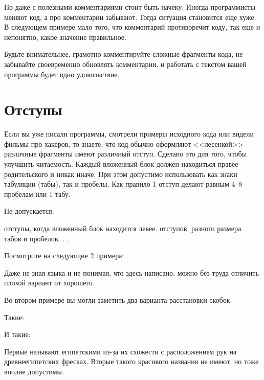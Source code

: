 \documentclass{article}
\begin{document}
Но даже с полезными комментариями стоит быть начеку. Иногда программисты меняют код, а про комментарии забывают. Тогда ситуация становится еще хуже. В следующем примере мало того, что комментарий противоречит коду, так еще и непонятно, какое значение правильное.


Будьте внимательнее, грамотно комментируйте сложные фрагменты кода, не забывайте своевременно обновлять комментарии, и работать с текстом вашей программы будет одно удовольствие.

\section*{Отступы}

Если вы уже писали программы, смотрели примеры исходного кода или видели фильмы про хакеров, то знаете, что код обычно оформляют <<лесенкой>> --- различные фрагменты имеют различный отступ. Сделано это для того, чтобы улучшить читаемость. Каждый вложенный блок должен находиться правее родительского и никак иначе. При этом допустимо использовать как знаки табуляции (табы), так и пробелы. Как правило 1 отступ делают равным 4--8 пробелам или 1 табу.

Не допускается:
\begin{itemize}
 отступы, когда вложенный блок находится левее.
 отступов.
 разного размера.
 табов и пробелов.
.
.
\end{itemize}

Посмотрите на следующие 2 примера:



Даже не зная языка и не понимая, что здесь написано, можно без труда отличить плохой вариант от хорошего.

Во втором примере вы могли заметить два варианта расстановки скобок.

Такие:


И такие:


Первые называют египетскими из-за их схожести с расположением рук на древнеегипетских фресках. Вторые такого красивого названия не имеют, но тоже вполне допустимы.
\end{document}
